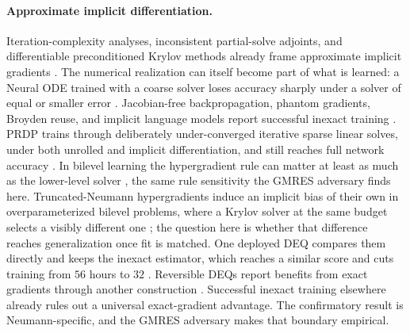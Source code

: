 \paragraph{Approximate implicit differentiation.}
Iteration-complexity analyses, inconsistent partial-solve adjoints, and
differentiable preconditioned Krylov methods already frame approximate implicit
gradients \citep{grazzi2020iteration,akbarzadeh2020consistent,montoison2026differentiable}.
The numerical realization can itself become part of what is learned: a Neural ODE
trained with a coarse solver loses accuracy sharply under a solver of equal or
smaller error \citep{ott2021resnet}.
Jacobian-free backpropagation, phantom gradients, Broyden reuse, and implicit
language models report successful inexact training
\citep{fung2022jfb,geng2021training,nguyen2023efficient,schone2025implicit}.
PRDP trains through deliberately under-converged iterative sparse linear solves,
under both unrolled and implicit differentiation, and still reaches full network
accuracy \citep{bhatia2025prdp}. In bilevel learning the hypergradient rule can
matter at least as much as the lower-level solver \citep{ehrhardt2024analyzing},
the same rule sensitivity the GMRES adversary finds here.
Truncated-Neumann hypergradients induce an implicit bias of their own in
overparameterized bilevel problems, where a Krylov solver at the same budget
selects a visibly different one \citep{vicol2022implicit}; the question here is
whether that difference reaches generalization once fit is matched.
One deployed DEQ compares them directly and keeps the inexact estimator, which
reaches a similar score and cuts training from $56$ hours to $32$
\citep{zheng2023deqnar}.
Reversible DEQs report benefits from exact gradients through another
construction \citep{mccallum2025reversible}. Successful inexact training
elsewhere already rules out a universal exact-gradient advantage. The
confirmatory result is Neumann-specific, and the GMRES adversary makes that
boundary empirical.
